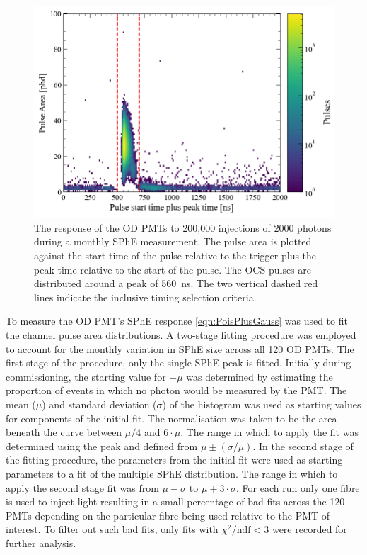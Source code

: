 \begin{figure}[ht!]
    \centering
    \includegraphics[width=0.8\linewidth]{figures/ODCommissioning/TimingVsPulseArea_2us.png}
    \caption{The response of the OD PMTs to 200,000 injections of 2000 photons during a monthly SPhE measurement. The pulse area is plotted against the start time of the pulse relative to the trigger plus the peak time relative to the start of the pulse. The OCS pulses are distributed around a peak of 560~ns. The two vertical dashed red lines indicate the inclusive timing selection criteria.}
    \label{fig:ODCommissioning/ODSPhE_TimingSelection}
\end{figure}


To measure the OD PMT's SPhE response \autoref{eqn:PoisPlusGauss} was used to fit the channel pulse area distributions. A two-stage fitting procedure was employed to account for the monthly variation in SPhE size across all 120 OD PMTs. The first stage of the procedure, only the single SPhE peak is fitted. Initially during commissioning, the starting value for $-\mu$ was determined by estimating the proportion of events in which no photon would be measured by the PMT. The mean ($\mu$) and standard deviation ($\sigma$) of the histogram was used as starting values for components of the initial fit. The normalisation was taken to be the area beneath the curve between $\mu/4$ and $6\cdot\mu$. The range in which to apply the fit was determined using the peak and defined from $\mu\pm(\sigma/\mu)$. In the second stage of the fitting procedure, the parameters from the initial fit were used as starting parameters to a fit of the multiple SPhE distribution. The range in which to apply the second stage fit was from $\mu-\sigma$ to $\mu+3\cdot\sigma$. For each run only one fibre is used to inject light resulting in a small percentage of bad fits across the 120 PMTs depending on the particular fibre being used relative to the PMT of interest. To filter out such bad fits, only fits with $\chi^2/\text{ndf}<3$ were recorded for further analysis.

